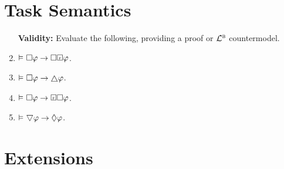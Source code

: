 \documentclass[a4paper, 11pt]{article}                  %
\begin{document}
\section{Task Semantics}

\begin{enumerate}

	\item[\bf Validity:] Evaluate the following, providing a proof or $\mathcal{L}^{\textsc{b}}$ countermodel.

    \item $\MLmodels[] \Box\metaA \rightarrow \Box\Future\metaA$.

    \item $\MLmodels[] \Box\metaA \rightarrow \always\metaA$.

    \item $\MLmodels[] \Box\metaA \rightarrow \Future\Box\metaA$.


    \item $\MLmodels[] \sometimes\metaA \rightarrow \Diamond\metaA$.


\end{enumerate}





\section{Extensions}
\end{document}

